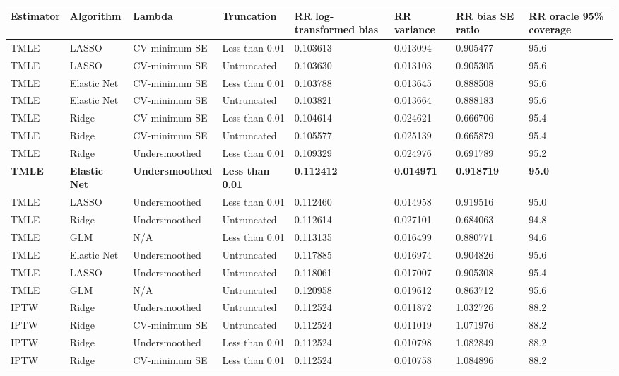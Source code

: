 
\begin{longtable}[l]{llllllll}
\toprule
Estimator & Algorithm & Lambda & Truncation & RR log-transformed bias & RR variance & RR bias SE ratio & RR oracle 95\% coverage\\
\midrule
TMLE & LASSO & CV-minimum SE & Less than 0.01 & 0.103613 & 0.013094 & 0.905477 & 95.6\\
TMLE & LASSO & CV-minimum SE & Untruncated & 0.103630 & 0.013103 & 0.905305 & 95.6\\
TMLE & Elastic Net & CV-minimum SE & Less than 0.01 & 0.103788 & 0.013645 & 0.888508 & 95.6\\
TMLE & Elastic Net & CV-minimum SE & Untruncated & 0.103821 & 0.013664 & 0.888183 & 95.6\\
TMLE & Ridge & CV-minimum SE & Less than 0.01 & 0.104614 & 0.024621 & 0.666706 & 95.4\\
TMLE & Ridge & CV-minimum SE & Untruncated & 0.105577 & 0.025139 & 0.665879 & 95.4\\
TMLE & Ridge & Undersmoothed & Less than 0.01 & 0.109329 & 0.024976 & 0.691789 & 95.2\\
\midrule
\textbf{TMLE} & \textbf{Elastic Net} & \textbf{Undersmoothed} & \textbf{Less than 0.01} & \textbf{0.112412} & \textbf{0.014971} & \textbf{0.918719} & \textbf{95.0}\\
\midrule
TMLE & LASSO & Undersmoothed & Less than 0.01 & 0.112460 & 0.014958 & 0.919516 & 95.0\\
TMLE & Ridge & Undersmoothed & Untruncated & 0.112614 & 0.027101 & 0.684063 & 94.8\\
TMLE & GLM & N/A & Less than 0.01 & 0.113135 & 0.016499 & 0.880771 & 94.6\\
TMLE & Elastic Net & Undersmoothed & Untruncated & 0.117885 & 0.016974 & 0.904826 & 95.6\\
TMLE & LASSO & Undersmoothed & Untruncated & 0.118061 & 0.017007 & 0.905308 & 95.4\\
TMLE & GLM & N/A & Untruncated & 0.120958 & 0.019612 & 0.863712 & 95.6\\
IPTW & Ridge & Undersmoothed & Untruncated & 0.112524 & 0.011872 & 1.032726 & 88.2\\
IPTW & Ridge & CV-minimum SE & Untruncated & 0.112524 & 0.011019 & 1.071976 & 88.2\\
IPTW & Ridge & Undersmoothed & Less than 0.01 & 0.112524 & 0.010798 & 1.082849 & 88.2\\
IPTW & Ridge & CV-minimum SE & Less than 0.01 & 0.112524 & 0.010758 & 1.084896 & 88.2\\

\end{longtable}
